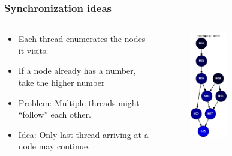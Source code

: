 \begin{frame}
\frametitle{Synchronization ideas}
\begin{columns}
  \begin{column}{0.5\textwidth}
    \begin{itemize}
            \item Each thread enumerates the nodes it visits.
            \item If a node already has a number, take the higher number
    \end{itemize}
    \vspace{0.3cm}
    \begin{itemize}
            \item Problem: Multiple threads might ``follow'' each other.
            \item Idea: Only last thread arriving at a node may continue.
    \end{itemize}
  \end{column}
%   
  \begin{column}{0.5\textwidth}
    \begin{figure}[ht]
    \includegraphics[width=0.4\textwidth]{img/paper}
    \end{figure}
  \end{column}
\end{columns}
\end{frame}

